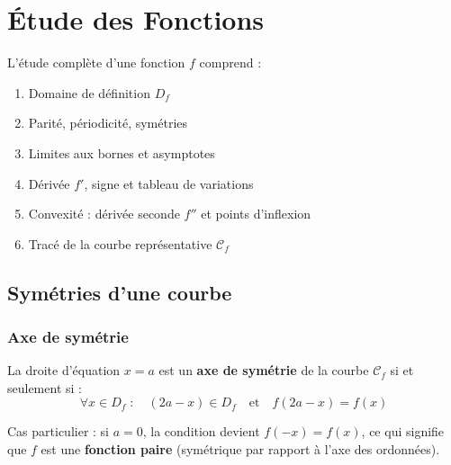 
\chapter{\'{E}tude des Fonctions}

\begin{rappel}
  L'\'{e}tude compl\`{e}te d'une fonction $f$ comprend :
  \begin{enumerate}
    \item Domaine de d\'{e}finition $D_f$
    \item Parit\'{e}, p\'{e}riodicit\'{e}, sym\'{e}tries
    \item Limites aux bornes et asymptotes
    \item D\'{e}riv\'{e}e $f'$, signe et tableau de variations
    \item Convexit\'{e} : d\'{e}riv\'{e}e seconde $f''$ et points d'inflexion
    \item Trac\'{e} de la courbe repr\'{e}sentative $\mathcal{C}_f$
  \end{enumerate}
\end{rappel}

\section{Sym\'{e}tries d'une courbe}

\subsection{Axe de sym\'{e}trie}

\begin{definition}
  La droite d'\'{e}quation $x = a$ est un \textbf{axe de sym\'{e}trie}
  de la courbe $\mathcal{C}_f$ si et seulement si :
  \[
    \forall x \in D_f \;:\quad (2a - x) \in D_f
    \quad \text{et} \quad
    f(2a - x) = f(x)
  \]
\end{definition}

\begin{remarque}
  Cas particulier : si $a = 0$, la condition devient $f(-x) = f(x)$,
  ce qui signifie que $f$ est une \textbf{fonction paire}
  (sym\'{e}trique par rapport \`{a} l'axe des ordonn\'{e}es).
\end{remarque}

